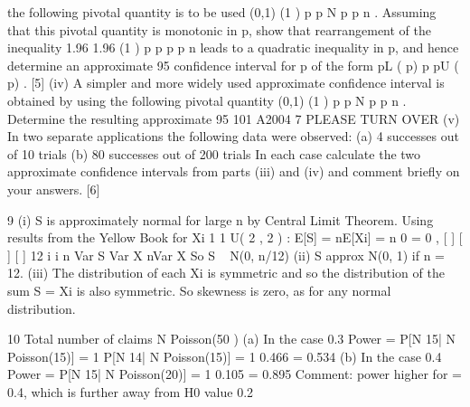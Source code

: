 the following pivotal quantity is to be used
(0,1)
(1 )
p p
N
p p
n
.
Assuming that this pivotal quantity is monotonic in p, show that rearrangement
of the inequality
1.96 1.96
(1 )
p p
p p
n
leads to a quadratic inequality in p, and hence determine an approximate 95%
confidence interval for p of the form pL ( p) p pU ( p) .
[5]
(iv) A simpler and more widely used approximate confidence interval is obtained
by using the following pivotal quantity
(0,1)
(1 )
p p
N
p p
n
.
Determine the resulting approximate 95%
101 A2004 7 PLEASE TURN OVER
(v) In two separate applications the following data were observed:
(a) 4 successes out of 10 trials
(b) 80 successes out of 200 trials
In each case calculate the two approximate confidence intervals from parts
(iii) and (iv) and comment briefly on your answers.
[6]

9 (i) S is approximately normal for large n by Central Limit Theorem.
Using results from the Yellow Book for Xi
1 1
U( 2 , 2 ) :
E[S] = nE[Xi] = n 0 = 0 , [ ] [ ] [ ]
12 i i
n
Var S Var X nVar X
So S ~ N(0, n/12)
(ii) S approx N(0, 1) if n = 12.
(iii) The distribution of each Xi is symmetric and so the distribution of the sum
S = Xi is also symmetric. So skewness is zero, as for any normal distribution.

10 Total number of claims N Poisson(50 )
(a) In the case 0.3
Power = P[N 15| N Poisson(15)]
= 1 P[N 14| N Poisson(15)] = 1 0.466 = 0.534
(b) In the case 0.4
Power = P[N 15| N Poisson(20)] = 1 0.105 = 0.895
Comment: power higher for = 0.4, which is further away from H0 value 0.2

